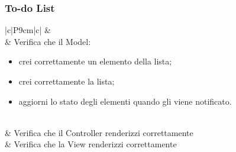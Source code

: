 \subsubsection{To-do List}
\begin{longtable}{|c|P{9cm}|c|}
	\hline {} &    \\ 
	\endfirsthead
	\hline {} & Verifica che il Model:
	\begin{itemize}
		\item crei correttamente un elemento della lista;
		\item crei correttamente la lista;
		\item aggiorni lo stato degli elementi quando gli viene notificato.
	\end{itemize}
	 \\
	\hline {} & Verifica che il Controller renderizzi correttamente  \\
	\hline {} & Verifica che la View renderizzi correttamente  \\
	\hline
	\caption{Test di unità per la To-do list}
\end{longtable}

